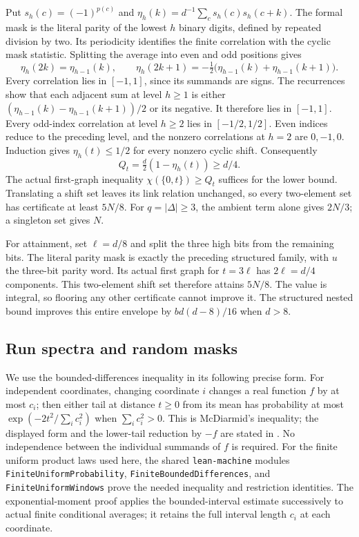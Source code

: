 \begin{outline}
Put $s_h(c)=(-1)^{p(c)}$ and
$\eta_h(k)=d^{-1}\sum_c s_h(c)s_h(c+k)$. The formal mask is the literal
parity of the lowest $h$ binary digits, defined by repeated division by
two. Its periodicity identifies the finite correlation with the cyclic
mask statistic. Splitting the average into even and odd positions gives
\[
 \eta_h(2k)=\eta_{h-1}(k),\qquad
 \eta_h(2k+1)=-\tfrac12\bigl(\eta_{h-1}(k)+\eta_{h-1}(k+1)\bigr).
\]
Every correlation lies in $[-1,1]$, since its summands are signs. The
recurrences show that each adjacent sum at level $h\ge1$ is either
$(\eta_{h-1}(k)-\eta_{h-1}(k+1))/2$ or its negative. It therefore lies in
$[-1,1]$. Every odd-index correlation at level $h\ge2$ lies in
$[-1/2,1/2]$. Even indices reduce to the preceding level, and the
nonzero correlations at $h=2$ are $0,-1,0$. Induction gives
$\eta_h(t)\le1/2$ for every nonzero cyclic shift. Consequently
\[
 Q_t=\tfrac d2(1-\eta_h(t))\ge d/4.
\]
The actual first-graph inequality $\chi(\{0,t\})\ge Q_t$ suffices for
the lower bound. Translating a shift set leaves its link relation
unchanged, so every two-element set has certificate at least $5N/8$.
For $q=|\Delta|\ge3$, the ambient term alone gives $2N/3$; a singleton
set gives $N$.

For attainment, set $\ell=d/8$ and split the three high bits from the
remaining bits. The literal parity mask is exactly the preceding
structured family, with $u$ the three-bit parity word. Its actual first
graph for $t=3\ell$ has $2\ell=d/4$ components. This two-element shift
set therefore attains $5N/8$. The value is integral, so flooring any
other certificate cannot improve it. The structured nested bound improves
this entire envelope by $bd(d-8)/16$ when $d>8$.
\end{outline}

\subsection{Run spectra and random masks}

We use the bounded-differences inequality in its following precise form.
For independent coordinates, changing coordinate $i$ changes a real function
$f$ by at most $c_i$; then either tail at distance $t\ge0$ from its mean
has probability at most $\exp(-2t^2/\sum_i c_i^2)$ when $\sum_i c_i^2>0$.
This is McDiarmid's inequality\cite{McDiarmid1989}; the displayed form and
the lower-tail reduction by $-f$ are stated in
\cite[Theorem~1, equation~(2)]{Warnke2012}. No independence between the
individual summands of $f$ is required. For the finite uniform product laws
used here, the shared \texttt{lean-machine} modules
\texttt{FiniteUniformProbability}, \texttt{FiniteBoundedDifferences}, and
\texttt{FiniteUniformWindows} prove the needed inequality and restriction
identities. The exponential-moment proof applies the bounded-interval
estimate successively to actual finite conditional averages; it retains
the full interval length $c_i$ at each coordinate.

